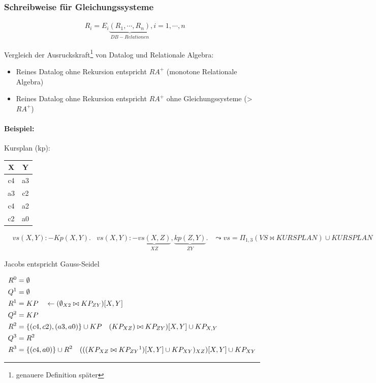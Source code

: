 \documentclass[12pt, a4paper]{article}
\begin{document}
\subsubsection*{Schreibweise für Gleichungssysteme}

\begin{align*}
&R_i = E_i \underbrace{(R_1, \cdots, R_n)}_{DB-Relationen}, i = 1, \cdots, n
\end{align*}


Vergleich der Ausruckskraft\footnote{genauere Definition später} von Datalog und Relationale Algebra:

\begin{itemize}
\item Reines Datalog ohne Rekursion entspricht $RA^+$ (monotone Relationale Algebra)
\item Reines Datalog ohne Rekursion entspricht $RA^+$ ohne Gleichungssysteme (> $RA^+$)
\end{itemize}

\paragraph{Beispiel:}

Kursplan (kp): \\
\begin{tabular}{|c|c|}
\hline
X & Y\\ \hline
c4 & a3 \\
a3 & c2 \\
c4 & a2 \\
c2 & a0 \\
\hline
\end{tabular}


\begin{align*}
&vs(X,Y) :- Kp(X,Y).
&vs(X,Y) :- \underbrace{vs(X,Z)}_{X Z}, \underbrace{kp(Z,Y)}_{Z Y}.
&\leadsto vs = \Pi_{1,3}(VS \bowtie KURSPLAN) \cup KURSPLAN
\end{align*}

Jacobs entspricht Gauss-Seidel

\begin{align*}
R^0 &= \emptyset \\
Q^1 &= \emptyset \\
R^1 &= KP \quad \leftarrow (\emptyset_{X2} \bowtie KP_{ZY}) [X,Y] \\
Q^2 &= KP \\
R^2 &= \{ (c4,c2), (a3,a0) \} \cup KP \quad (KP_{XZ}) \bowtie KP_{ZY})[X,Y] \cup KP_{X,Y} \\
Q^3 &= R^2 \\
R^3 &= \{(c4,a0)\} \cup R^2 \quad (((KP_{XZ} \bowtie KP_{ZY}\footnotemark)[X,Y] \cup KP_{XY})_{XZ})[X,Y] \cup KP_{XY}  \\
\end{align*}
\end{document}
